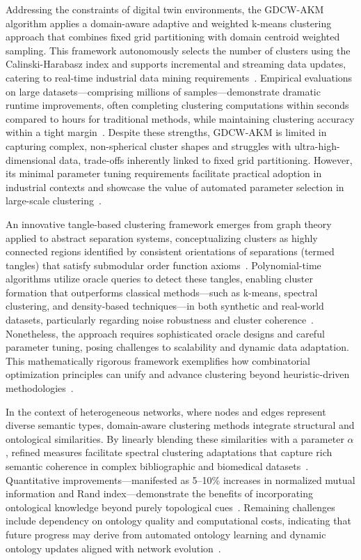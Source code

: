 \documentclass[sigconf]{acmart}
\begin{document}
Addressing the constraints of digital twin environments, the GDCW-AKM algorithm applies a domain-aware adaptive and weighted k-means clustering approach that combines fixed grid partitioning with domain centroid weighted sampling. This framework autonomously selects the number of clusters using the Calinski-Harabasz index and supports incremental and streaming data updates, catering to real-time industrial data mining requirements~\cite{ref20}. Empirical evaluations on large datasets—comprising millions of samples—demonstrate dramatic runtime improvements, often completing clustering computations within seconds compared to hours for traditional methods, while maintaining clustering accuracy within a tight margin~\cite{ref20}. Despite these strengths, GDCW-AKM is limited in capturing complex, non-spherical cluster shapes and struggles with ultra-high-dimensional data, trade-offs inherently linked to fixed grid partitioning. However, its minimal parameter tuning requirements facilitate practical adoption in industrial contexts and showcase the value of automated parameter selection in large-scale clustering~\cite{ref20}.

An innovative tangle-based clustering framework emerges from graph theory applied to abstract separation systems, conceptualizing clusters as highly connected regions identified by consistent orientations of separations (termed tangles) that satisfy submodular order function axioms~\cite{ref13}. Polynomial-time algorithms utilize oracle queries to detect these tangles, enabling cluster formation that outperforms classical methods—such as k-means, spectral clustering, and density-based techniques—in both synthetic and real-world datasets, particularly regarding noise robustness and cluster coherence~\cite{ref13}. Nonetheless, the approach requires sophisticated oracle designs and careful parameter tuning, posing challenges to scalability and dynamic data adaptation. This mathematically rigorous framework exemplifies how combinatorial optimization principles can unify and advance clustering beyond heuristic-driven methodologies~\cite{ref13}.

In the context of heterogeneous networks, where nodes and edges represent diverse semantic types, domain-aware clustering methods integrate structural and ontological similarities. By linearly blending these similarities with a parameter \(\alpha\), refined measures facilitate spectral clustering adaptations that capture rich semantic coherence in complex bibliographic and biomedical datasets~\cite{ref14}. Quantitative improvements—manifested as 5–10\% increases in normalized mutual information and Rand index—demonstrate the benefits of incorporating ontological knowledge beyond purely topological cues~\cite{ref14}. Remaining challenges include dependency on ontology quality and computational costs, indicating that future progress may derive from automated ontology learning and dynamic ontology updates aligned with network evolution~\cite{ref14}.
\end{document}
